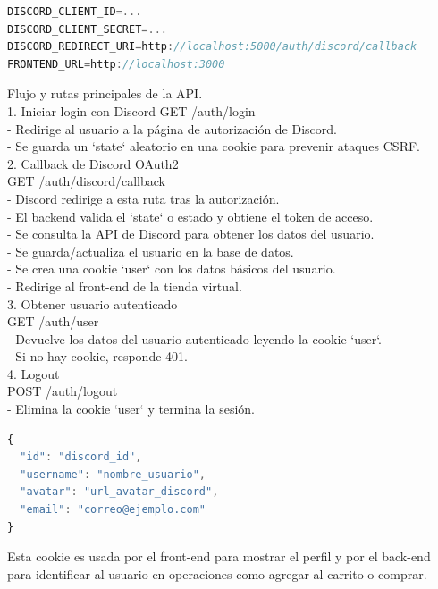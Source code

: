 \documentclass[a4paper,12pt]{article}
\begin{document}
\begin{lstlisting}[language=JavaScript, caption={Se agregan estos valores al archivo `.env` del backend:}] 
DISCORD_CLIENT_ID=...
DISCORD_CLIENT_SECRET=...
DISCORD_REDIRECT_URI=http://localhost:5000/auth/discord/callback
FRONTEND_URL=http://localhost:3000
\end{lstlisting}
\newpage
Flujo y rutas principales de la API.\\

1. Iniciar login con Discord
GET /auth/login\\
- Redirige al usuario a la página de autorización de Discord.\\
- Se guarda un `state` aleatorio en una cookie para prevenir ataques CSRF.\\

2. Callback de Discord OAuth2\\
GET /auth/discord/callback\\
- Discord redirige a esta ruta tras la autorización.\\
- El backend valida el `state` o estado y obtiene el token de acceso.\\
- Se consulta la API de Discord para obtener los datos del usuario.\\
- Se guarda/actualiza el usuario en la base de datos.\\
- Se crea una cookie `user` con los datos básicos del usuario.\\
- Redirige al front-end de la tienda virtual.\\

3. Obtener usuario autenticado\\
GET /auth/user\\
- Devuelve los datos del usuario autenticado leyendo la cookie `user`.\\
- Si no hay cookie, responde 401.\\

4. Logout\\
POST /auth/logout\\
- Elimina la cookie `user` y termina la sesión.\\

\begin{lstlisting}[language=JavaScript, caption={La cookie que se genera para guardar los datos del usuario `user` contiene un JSON con:}] 
{
  "id": "discord_id",
  "username": "nombre_usuario",
  "avatar": "url_avatar_discord",
  "email": "correo@ejemplo.com"
}
\end{lstlisting}
Esta cookie es usada por el front-end para mostrar el perfil y por el back-end para identificar al usuario en operaciones como agregar al carrito o comprar.\\
\end{document}

